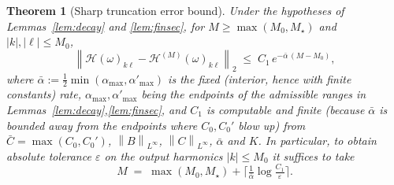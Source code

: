 \documentclass{amsart}
\newtheorem{theorem}{Theorem}
\theoremstyle{definition}
\newcommand{\norm}[1]{\left\lVert#1\right\rVert}
\newcommand{\Hcal}{\mathcal{H}}
\begin{document}
\begin{theorem}[Sharp truncation error bound]\label{thm:trunc}
Under the hypotheses of Lemmas~\ref{lem:decay} and \ref{lem:finsec}, for
$M\ge\max(M_0,M_\star)$ and $|k|,|\ell|\le M_0$,
\begin{equation}\label{eq:trerr}
\norm{\Hcal(\omega)_{k\ell}-\Hcal^{(M)}(\omega)_{k\ell}}_2
\;\le\; C_1\,e^{-\bar\alpha\,(M-M_0)},
\end{equation}
where $\bar\alpha:=\tfrac12\min(\alpha_{\max},\alpha'_{\max})$ is the fixed
(interior, hence with finite constants) rate, $\alpha_{\max},\alpha'_{\max}$ being
the endpoints of the admissible ranges in Lemmas~\ref{lem:decay},\ref{lem:finsec},
and $C_1$ is computable and \emph{finite} (because $\bar\alpha$ is bounded away
from the endpoints where $C_0,C_0'$ blow up) from
$\bar C=\max(C_0,C_0')$, $\norm{B}_{L^\infty}$, $\norm{C}_{L^\infty}$,
$\bar\alpha$ and $K$. In particular, to obtain absolute tolerance $\varepsilon$
on the output harmonics $|k|\le M_0$ it suffices to take
\begin{equation}\label{eq:Mchoice}
M\;=\;\max(M_0,M_\star)+\Big\lceil \tfrac1{\bar\alpha}\log\tfrac{C_1}{\varepsilon}\Big\rceil .
\end{equation}
\end{theorem}
\end{document}
